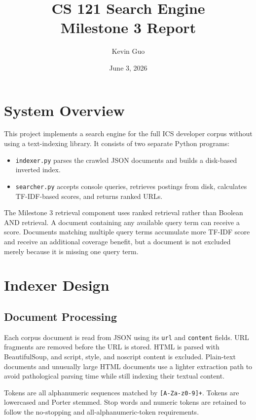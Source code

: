 \documentclass[11pt]{article}
\title{\textbf{CS 121 Search Engine}\\Milestone 3 Report}
\author{Kevin Guo}
\date{June 3, 2026}
\newcommand{\code}[1]{\texttt{#1}}
\begin{document}
\maketitle

\section{System Overview}

This project implements a search engine for the full ICS developer corpus without
using a text-indexing library. It consists of two separate Python programs:

\begin{itemize}
  \item \code{indexer.py} parses the crawled JSON documents and builds a
  disk-based inverted index.
  \item \code{searcher.py} accepts console queries, retrieves postings from disk,
  calculates TF-IDF-based scores, and returns ranked URLs.
\end{itemize}

The Milestone 3 retrieval component uses ranked retrieval rather than Boolean
AND retrieval. A document containing any available query term can receive a
score. Documents matching multiple query terms accumulate more TF-IDF score and
receive an additional coverage benefit, but a document is not excluded merely
because it is missing one query term.

\section{Indexer Design}

\subsection{Document Processing}

Each corpus document is read from JSON using its \code{url} and \code{content}
fields. URL fragments are removed before the URL is stored. HTML is parsed with
BeautifulSoup, and script, style, and noscript content is excluded. Plain-text
documents and unusually large HTML documents use a lighter extraction path to
avoid pathological parsing time while still indexing their textual content.

Tokens are all alphanumeric sequences matched by
\code{[A-Za-z0-9]+}. Tokens are lowercased and Porter stemmed. Stop words and
numeric tokens are retained to follow the no-stopping and all-alphanumeric-token
requirements.
\end{document}
